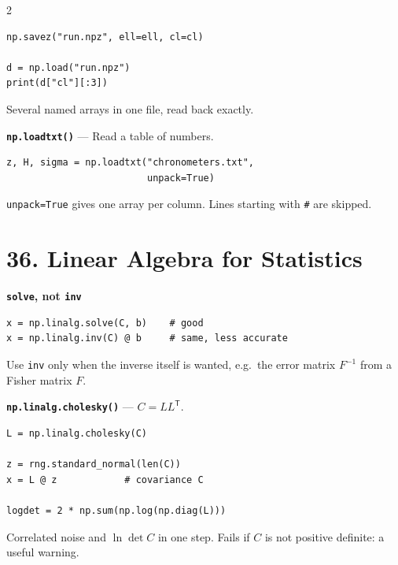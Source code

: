 \documentclass[10pt,a4paper]{article}
\begin{document}
\begin{multicols}{2}
\begin{card}
\begin{lstlisting}[style=pythonstyle]
np.savez("run.npz", ell=ell, cl=cl)

d = np.load("run.npz")
print(d["cl"][:3])
\end{lstlisting}

Several named arrays in one file, read back exactly.
\end{card}

\begin{card}
\textbf{\texttt{np.loadtxt()}} --- Read a table of numbers.

\begin{lstlisting}[style=pythonstyle]
z, H, sigma = np.loadtxt("chronometers.txt",
                         unpack=True)
\end{lstlisting}

\texttt{unpack=True} gives one array per column. Lines starting with
\texttt{\#} are skipped.
\end{card}

\section*{36. Linear Algebra for Statistics}

\begin{card}
\textbf{\texttt{solve}, not \texttt{inv}}

\begin{lstlisting}[style=pythonstyle]
x = np.linalg.solve(C, b)    # good
x = np.linalg.inv(C) @ b     # same, less accurate
\end{lstlisting}

Use \texttt{inv} only when the inverse itself is wanted, e.g.\ the error
matrix $F^{-1}$ from a Fisher matrix $F$.
\end{card}

\begin{card}
\textbf{\texttt{np.linalg.cholesky()}} --- $C=LL^{\mathsf T}$.

\begin{lstlisting}[style=pythonstyle]
L = np.linalg.cholesky(C)

z = rng.standard_normal(len(C))
x = L @ z            # covariance C

logdet = 2 * np.sum(np.log(np.diag(L)))
\end{lstlisting}

Correlated noise and $\ln\det C$ in one step. Fails if $C$ is not
positive definite: a useful warning.
\end{card}


\end{multicols}
\end{document}
